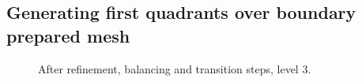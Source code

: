 \documentclass[10pt]{article}
\begin{document}
\subsection{Generating first quadrants over boundary prepared mesh}


\begin{figure}[htb]
\centering
 \caption{After refinement, balancing and transition steps, level 3.}
\label{fig:generate3}
\end{figure}
\end{document}
